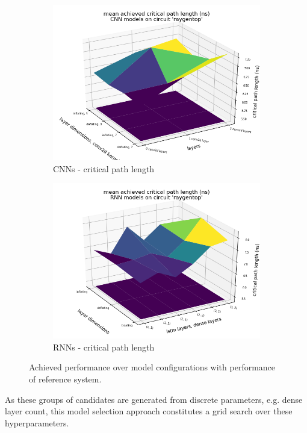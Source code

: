 \begin{figure}
\begin{subfigure}[b]{0.45\linewidth}
	\includegraphics[width=\linewidth]{plots/cnn-hyperopt-critical-path-with-reference.png}
	\caption{\glspl{CNN} - critical path length}
\end{subfigure}
\begin{subfigure}[b]{0.45\linewidth}
	\includegraphics[width=\linewidth]{plots/rnn-hyperopt-critical-path-with-reference.png}
	\caption{\glspl{RNN} - critical path length}
\end{subfigure}
\caption{Achieved performance over model configurations with performance of reference system.}
\label{fig:eval-hyperopt-surface-reference}
\end{figure}

As these groups of candidates are generated from discrete parameters, e.g. dense layer count, this model selection approach constitutes a grid search over these hyperparameters.

